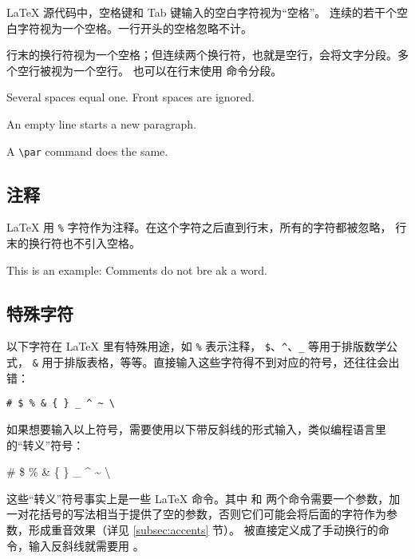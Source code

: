 \LaTeX{} 源代码中，空格键和 Tab 键输入的空白字符视为“空格”。
连续的若干个空白字符视为一个空格。一行开头的空格忽略不计。

行末的换行符视为一个空格；但连续两个换行符，也就是空行，会将文字分段。多个空行被视为一个空行。
也可以在行末使用  命令分段。
\begin{example}
Several spaces     equal one.
  Front spaces are ignored.

An empty line starts a new
paragraph.\par
A \verb|\par| command does
the same.
\end{example}

\subsection{注释}\label{subsec:comments}

\LaTeX{} 用 \texttt\% 字符作为注释。在这个字符之后直到行末，所有的字符都被忽略，
行末的换行符也不引入空格。
\begin{example}
This is an %
example: Comments do not bre%
ak a word.
\end{example}

\subsection{特殊字符}\label{subsec:special-chars}

以下字符在 \LaTeX{} 里有特殊用途，如 \texttt\% 表示注释， \texttt\$、\texttt\textasciicircum 、\texttt\_ 等用于排版数学公式，
\texttt\& 用于排版表格，等等。直接输入这些字符得不到对应的符号，还往往会出错：
\begin{verbatim}
# $ % & { } _ ^ ~ \
\end{verbatim}

如果想要输入以上符号，需要使用以下带反斜线的形式输入，类似编程语言里的“转义”符号：
\begin{example}
\# \$ \% \& \{ \} \_
\^{} \~{} \textbackslash
\end{example}

这些“转义”符号事实上是一些 \LaTeX{} 命令。其中 \cmd{\textasciicircum} 和 \cmd{\textasciitilde}
两个命令需要一个参数，加一对花括号的写法相当于提供了空的参数，否则它们可能会将后面的字符作为参数，形成重音效果（详见 \ref{subsec:accents} 节）。
\crcmd{} 被直接定义成了手动换行的命令，输入反斜线就需要用 。

